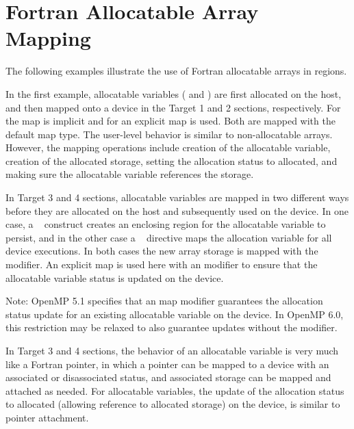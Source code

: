 \pagebreak
\section{Fortran Allocatable Array Mapping}
\label{sec:fort_allocatable_array_mapping}


The following examples illustrate the use of Fortran allocatable arrays in  regions.

In the first example,  allocatable variables ( and ) are first allocated
on the host, and then mapped onto a device in the Target 1 and 2 sections, respectively.
For  the map is implicit and for  an explicit map is used.
Both are mapped with the default  map type.
The user-level behavior is similar to non-allocatable arrays.
However, the mapping operations include creation of the allocatable variable,
creation of the allocated storage, setting the allocation status to allocated,
and making sure the allocatable variable references the storage.

In Target 3 and 4 sections, allocatable variables are mapped in two
different ways before they are allocated on the host and subsequently used on the device.
In one case, a ~ construct creates an enclosing region for
the allocatable variable to persist, and in the other case a
~ directive maps the allocation variable for all device executions.
In both cases the new array storage is mapped  with the  modifier.
An explicit map is used here with an  modifier to ensure that the allocatable
variable status is updated on the device.

Note: OpenMP 5.1 specifies that an  map modifier guarantees the
allocation status update for an existing allocatable variable on the device.
In OpenMP 6.0, this restriction may be relaxed to also guarantee updates
without the  modifier.

In Target 3 and 4 sections, the behavior of an allocatable variable is very
much like a Fortran pointer, in which a pointer can be mapped to a device with an associated
or disassociated status, and associated storage can be mapped and attached as needed.
For allocatable variables, the update of the allocation status to allocated (allowing
reference to allocated storage) on the device, is similar to pointer attachment.


